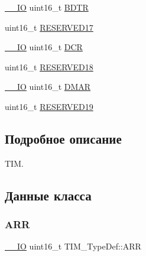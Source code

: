 \begin{DoxyCompactItemize}
\item 
\mbox{\hyperlink{group___c_m_s_i_s___c_m3__core__definitions_gaec43007d9998a0a0e01faede4133d6be}{\+\_\+\+\_\+\+IO}} uint16\+\_\+t \mbox{\hyperlink{struct_t_i_m___type_def_a32bbedb8b418359c6873375ec949cf8b}{B\+D\+TR}}
\item 
uint16\+\_\+t \mbox{\hyperlink{struct_t_i_m___type_def_aad6f1eb74535c7cda84b8ad8cb76d65e}{R\+E\+S\+E\+R\+V\+E\+D17}}
\item 
\mbox{\hyperlink{group___c_m_s_i_s___c_m3__core__definitions_gaec43007d9998a0a0e01faede4133d6be}{\+\_\+\+\_\+\+IO}} uint16\+\_\+t \mbox{\hyperlink{struct_t_i_m___type_def_ad3186a43824621f049e7eff37c88ad4e}{D\+CR}}
\item 
uint16\+\_\+t \mbox{\hyperlink{struct_t_i_m___type_def_a5f03da5369c7b0bf10fd480011b12718}{R\+E\+S\+E\+R\+V\+E\+D18}}
\item 
\mbox{\hyperlink{group___c_m_s_i_s___c_m3__core__definitions_gaec43007d9998a0a0e01faede4133d6be}{\+\_\+\+\_\+\+IO}} uint16\+\_\+t \mbox{\hyperlink{struct_t_i_m___type_def_a4e0fbb52e6dd4bdabcb3f3b2f4bae40c}{D\+M\+AR}}
\item 
uint16\+\_\+t \mbox{\hyperlink{struct_t_i_m___type_def_a58477bdaaf8fcbcd9c8411729daaf535}{R\+E\+S\+E\+R\+V\+E\+D19}}
\end{DoxyCompactItemize}


\subsection{Подробное описание}
T\+IM. 

\subsection{Данные класса}
\mbox{\label{struct_t_i_m___type_def_a32ceda49b331ef9f61567ef9ffdf045e}} 
\subsubsection{\texorpdfstring{ARR}{ARR}}
{\footnotesize\ttfamily \mbox{\hyperlink{group___c_m_s_i_s___c_m3__core__definitions_gaec43007d9998a0a0e01faede4133d6be}{\+\_\+\+\_\+\+IO}} uint16\+\_\+t T\+I\+M\+\_\+\+Type\+Def\+::\+A\+RR}

\mbox{\label{struct_t_i_m___type_def_a32bbedb8b418359c6873375ec949cf8b}} 
